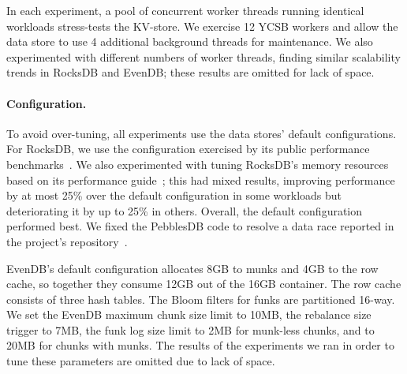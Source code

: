 \documentclass[sigplan,10pt]{acmart}
\newcommand{\inred}[1]{{\color{red}{#1}}}
\newcommand{\remove}[1]{}
\newcommand{\sys}{EvenDB}
\begin{document}
In each experiment, a pool of concurrent worker threads running identical
workloads stress-tests the KV-store. We exercise 12 YCSB workers 
and allow the data store to use 4 additional background threads for maintenance.
We also experimented with different numbers of worker threads, finding similar scalability trends in RocksDB and 
\sys; these results are omitted for lack of space.


\remove{
\paragraph{Metrics.} Our primary performance metrics are \emph{throughput} 
and \emph{latency percentiles}, as produced by YCSB. In addition, we report \emph{write amplification}, 
namely, bytes written to storage over bytes passed from the application. 
}





\paragraph{Configuration.} 
To avoid over-tuning, all experiments use the data stores' default configurations. For RocksDB, we use the configuration exercised by its public 
performance benchmarks~\cite{RocksDBPerf}. 
We also experimented with tuning RocksDB's memory resources based on its performance guide~\cite{RocksDBMemoryTuning}; 
this had mixed results, improving performance by at most 25\% over the default configuration in some workloads but 
deteriorating it by up to 25\% in others. Overall, the default configuration performed best. 
We fixed the PebblesDB code to resolve a data race reported in the project's repository~\cite{pebbles-git-issue}. 

\sys's default configuration 
allocates 8GB to munks and 4GB to the row cache,
so together they consume 12GB out of the 16GB container. 
The row cache consists of three hash tables.  
The Bloom filters for funks are partitioned 16-way.  
We set the \sys\/ maximum chunk size limit to 10MB, the rebalance size trigger to 7MB, 
the funk log size limit to 2MB for munk-less chunks, and to 20MB for chunks with munks. 
The results of the experiments we ran in order to tune these parameters are omitted due to lack of space.
\end{document}
